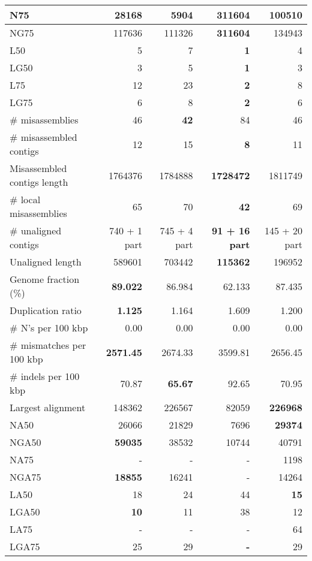 \documentclass[12pt,a4paper]{article}
\begin{document}
\begin{table}[ht]
\begin{center}
\begin{tabular}{|l*{4}{|r}|}
N75 & 28168 & 5904 & {\bf 311604} & 100510 \\ \hline
NG75 & 117636 & 111326 & {\bf 311604} & 134943 \\ \hline
L50 & 5 & 7 & {\bf 1} & 4 \\ \hline
LG50 & 3 & 5 & {\bf 1} & 3 \\ \hline
L75 & 12 & 23 & {\bf 2} & 8 \\ \hline
LG75 & 6 & 8 & {\bf 2} & 6 \\ \hline
\# misassemblies & 46 & {\bf 42} & 84 & 46 \\ \hline
\# misassembled contigs & 12 & 15 & {\bf 8} & 11 \\ \hline
Misassembled contigs length & 1764376 & 1784888 & {\bf 1728472} & 1811749 \\ \hline
\# local misassemblies & 65 & 70 & {\bf 42} & 69 \\ \hline
\# unaligned contigs & 740 + 1 part & 745 + 4 part & {\bf 91 + 16 part} & 145 + 20 part \\ \hline
Unaligned length & 589601 & 703442 & {\bf 115362} & 196952 \\ \hline
Genome fraction (\%) & {\bf 89.022} & 86.984 & 62.133 & 87.435 \\ \hline
Duplication ratio & {\bf 1.125} & 1.164 & 1.609 & 1.200 \\ \hline
\# N's per 100 kbp & 0.00 & 0.00 & 0.00 & 0.00 \\ \hline
\# mismatches per 100 kbp & {\bf 2571.45} & 2674.33 & 3599.81 & 2656.45 \\ \hline
\# indels per 100 kbp & 70.87 & {\bf 65.67} & 92.65 & 70.95 \\ \hline
Largest alignment & 148362 & 226567 & 82059 & {\bf 226968} \\ \hline
NA50 & 26066 & 21829 & 7696 & {\bf 29374} \\ \hline
NGA50 & {\bf 59035} & 38532 & 10744 & 40791 \\ \hline
NA75 & - & - & - & 1198 \\ \hline
NGA75 & {\bf 18855} & 16241 & - & 14264 \\ \hline
LA50 & 18 & 24 & 44 & {\bf 15} \\ \hline
LGA50 & {\bf 10} & 11 & 38 & 12 \\ \hline
LA75 & - & - & - & 64 \\ \hline
LGA75 & 25 & 29 & {\bf -} & 29 \\ \hline
\end{tabular}
\end{center}
\end{table}
\end{document}
